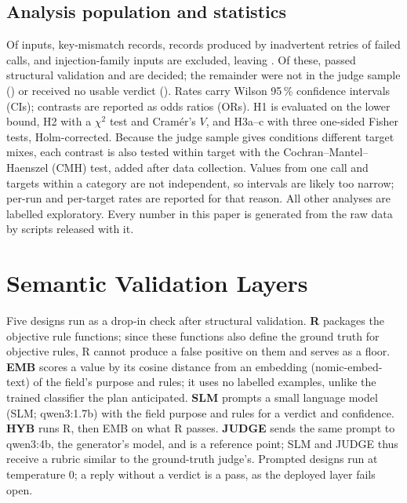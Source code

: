 \documentclass[conference]{IEEEtran}
\begin{document}
\subsection{Analysis population and statistics}
Of  inputs,  key-mismatch records,  records produced
by inadvertent retries of failed calls, and  injection-family inputs are excluded, leaving
. Of these,  passed structural validation and  are
decided; the remainder were not in the judge sample () or received no usable
verdict (). Rates carry Wilson 95\,\% confidence intervals (CIs); contrasts are reported as odds ratios (ORs). H1 is evaluated on the lower
bound, H2 with a $\chi^2$ test and Cram\'er's $V$, and H3a--c with three one-sided Fisher tests,
Holm-corrected. Because the judge sample gives conditions different target mixes, each contrast is
also tested within target with the Cochran--Mantel--Haenszel (CMH) test, added after data collection.
Values from one call and targets within a category are not independent, so intervals are likely
too narrow; per-run and per-target rates are reported for that reason. All other analyses are
labelled exploratory. Every number in this paper is generated from the raw data by scripts released
with it.

\section{Semantic Validation Layers}
\label{sec:layer}

Five designs run as a drop-in check after structural validation. \textbf{R} packages the objective
rule functions; since these functions also define the ground truth for objective rules, R cannot
produce a false positive on them and serves as a floor. \textbf{EMB} scores a value by its cosine
distance from an embedding (nomic-embed-text) of the field's purpose and rules; it uses no labelled
examples, unlike the trained classifier the plan anticipated. \textbf{SLM} prompts a small language
model (SLM; qwen3:1.7b) with the field purpose and rules for a verdict and confidence. \textbf{HYB} runs
R, then EMB on what R passes. \textbf{JUDGE} sends the same prompt to qwen3:4b, the generator's model,
and is a reference point; SLM and JUDGE thus receive a rubric similar to the ground-truth judge's.
Prompted designs run at temperature 0; a reply without a verdict is a pass, as the deployed layer
fails open.
\end{document}
